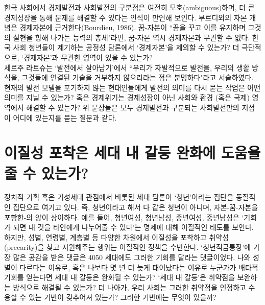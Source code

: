 \documentclass[graybox]{svmult}
\begin{document}
  한국 사회에서 경제발전과 사회발전의 구분점은 여전히 모호(ambiguous)하며, 더 큰 경제성장을 통해 문제를 해결할 수 있다는 인식이 만연해 보인다. 부르디외의 자본 개념은 경제자본에 근거한다(Bourdieu, 1986). 꿈-자본이 ``꿈을 꾸고 이를 유지하며 그것의 실현을 향해 나가는 능력의 총체"라면, 꿈-자본 역시 경제자본과 무관할 수 없다. 한국 사회 청년들이 제기하는 공정성 담론에서 `경제자본'을 제외할 수 있는가? 더 극단적으로, `경제자본'과 무관한 영역이 있을 수 있는가?\\
 
 세르주 라트슈는 `발전에서 살아남기'에서 ``우리가 자발적으로 발전을, 우리의 생활 방식을, 그것들에 연결된 기술을 거부하지 않으리라는 점은 분명하다"라고 서술하였다. 현재의 발전 모델을 포기하지 않는 현대인들에게 발전의 의미를 다시 묻는 작업은 어떤 의미를 지닐 수 있는가? 혹은 경제위기는 경제성장이 아닌 사회와 환경 (혹은 국제) 영역에서 해결할 수 있는가? 위 문장들은 모두 경제발전과 구분되는 사회발전만의 지점이 어디에 있는지를 묻는 질문과 같다.
 
\section{이질성 포착은 세대 내 갈등 완화에 도움을 줄 수 있는가?}
 정치적 기획 혹은 기성세대 관점에서 비롯된 세대 담론이 `청년'이라는 집단을 동질적인 집단으로 여기고 있다. 즉, 청년이라고 해서 다 같은 청년이 아니며, 자본-꿈-자본을 포함한-의 양이 상이하다. 예를 들어, 청년여성, 청년남성, 중년여성, 중년남성은 `기회가 되면 내 것을 타인에게 나누어줄 수 있다'는 명제에 대해 이질적인 태도를 보인다. 하지만, 성별, 연령별, 계층별 등 다양한 차원에서 이질성을 포착하고 취약성(precarity)을 찾고 지원해주는 행위는 이질적인 정책을 수반한다. `청년적금통장'에 가장 많은 공감을 받은 댓글은 4050 세대에도 그러한 기회를 달라는 댓글이었다. 나와 성별이 다르다는 이유로, 혹은 나보다 몇 년 더 늦게 태어났다는 이유로 누군가가 배타적 기회를 얻는다면 세대 내 갈등은 완화될 수 있는가? `세대 내 갈등'은 취약점을 보완하는 방식으로 해결될 수 있는가? 더 나아가, 우리 사회는 그러한 취약점을 인정하고 수용할 수 있는 기반이 갖추어져 있는가? 그러한 기반에는 무엇이 있을까?

%
\end{document}
